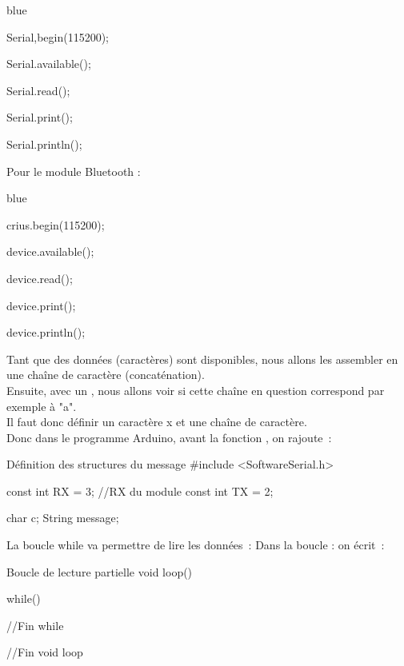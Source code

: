 \begin{items}{blue}{\Triangle}
    \item Serial,begin(115200);
    \item Serial.available();
    \item Serial.read();	
    \item Serial.print();
    \item Serial.println();
\end{items}

Pour le module Bluetooth : \\

\begin{items}{blue}{\Triangle}
    \item crius.begin(115200);
    \item device.available();
    \item device.read();	
    \item device.print();
    \item device.println();
\end{items}


Tant que des données (caractères) sont disponibles, nous allons les assembler en une chaîne de caractère (concaténation). \\
Ensuite, avec un , nous allons voir si cette chaîne en question correspond par exemple à "a". \\ 

Il faut donc définir un caractère x et une chaîne de caractère.\\
Donc dans le programme Arduino, avant la fonction , on rajoute :

\begin{Cpp}{Définition des structures du message}
#include <SoftwareSerial.h>

const int RX = 3; //RX du module
const int TX = 2;

char c;
String message;

\end{Cpp}

La boucle while va permettre de lire les données : 
Dans la boucle  : on écrit :

\begin{Cpp}{Boucle de lecture partielle}
 void loop() {
 
    while() {
    
    }//Fin while

 }//Fin void loop

\end{Cpp}

